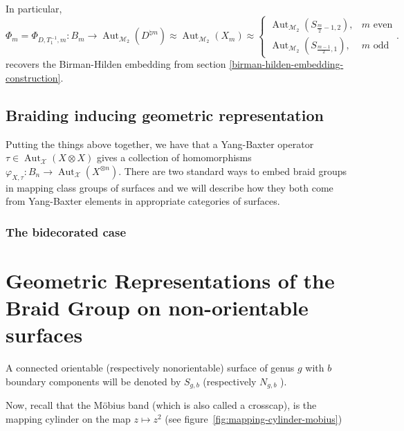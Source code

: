 \documentclass[reqno]{amsart}
\theoremstyle{definition}
\theoremstyle{remark}
\DeclareMathOperator{\Aut}{Aut}
\begin{document}
In particular, 
\[
    \Phi_m = \Phi_{D,T_1^{-1},m}
\colon B_m \to \Aut_{\mathcal{M}_2}
\left( D^{\natural m} \right) \approx
\Aut_{\mathcal{M}_2} \left( 
X_m\right)
\approx
\begin{cases}
    \Aut_{\mathcal{M}_2} 
    \left( S_{\frac{m}{2}-1,2} \right) ,& m\text{ even}\\
    \Aut_{\mathcal{M}_2} \left( 
S_{\frac{m-1}{2}, 1} \right),& m\text{ odd}
\end{cases}.
\] 
recovers the Birman-Hilden embedding from
section \ref{birman-hilden-embedding-construction}.








\subsection{Braiding inducing geometric representation}
     
     Putting the things above together, we have that a 
     Yang-Baxter operator $\tau \in \Aut_{\mathcal{X}} 
     \left( X \otimes X \right) $ gives a collection
     of homomorphisms
     $\varphi_{X, \tau} \colon B_n \to \Aut_{\mathcal{X}}
     \left( X^{\otimes n} \right) $. There
     are two standard ways to embed braid groups in mapping class
     groups of surfaces and we will describe how they
     both come from Yang-Baxter elements in appropriate categories
     of surfaces.


     
     \subsubsection{The bidecorated case}







\newpage

\section{Geometric Representations of the Braid Group on
non-orientable surfaces}


A connected orientable (respectively nonorientable) surface
of genus $g$ with $b$ boundary components will
be denoted by $S_{g,b}$ (respectively $N_{g,b}$ ).

Now, recall that the Möbius band (which is also called
a crosscap), is the mapping cylinder on the map
$z \mapsto z^2$ (see figure~\ref{fig:mapping-cylinder-mobius})
\end{document}
